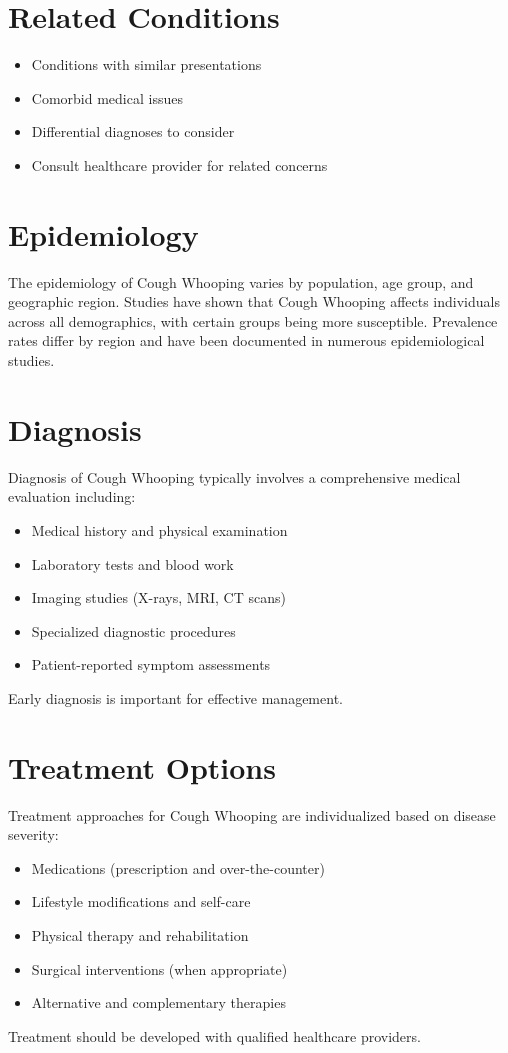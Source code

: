 \section*{Related Conditions}
\begin{itemize}
  \item Conditions with similar presentations
  \item Comorbid medical issues
  \item Differential diagnoses to consider
  \item Consult healthcare provider for related concerns
\end{itemize}

\section*{Epidemiology}
The epidemiology of Cough Whooping varies by population, age group, and geographic region. Studies have shown that Cough Whooping affects individuals across all demographics, with certain groups being more susceptible. Prevalence rates differ by region and have been documented in numerous epidemiological studies.

\section*{Diagnosis}
Diagnosis of Cough Whooping typically involves a comprehensive medical evaluation including:
\begin{itemize}
  \item Medical history and physical examination
  \item Laboratory tests and blood work
  \item Imaging studies (X-rays, MRI, CT scans)
  \item Specialized diagnostic procedures
  \item Patient-reported symptom assessments
\end{itemize}
Early diagnosis is important for effective management.

\section*{Treatment Options}
Treatment approaches for Cough Whooping are individualized based on disease severity:
\begin{itemize}
  \item Medications (prescription and over-the-counter)
  \item Lifestyle modifications and self-care
  \item Physical therapy and rehabilitation
  \item Surgical interventions (when appropriate)
  \item Alternative and complementary therapies
\end{itemize}
Treatment should be developed with qualified healthcare providers.

